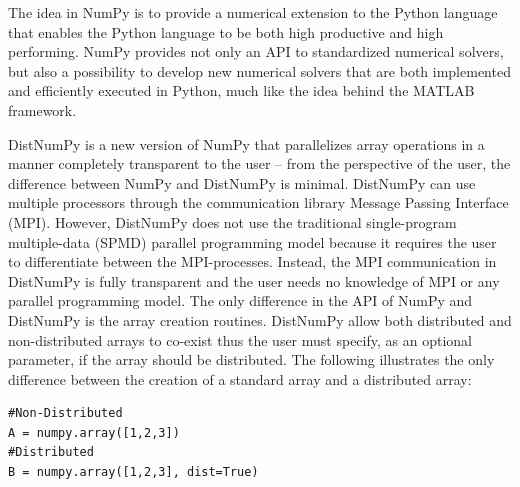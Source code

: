 \documentclass[preprint]{../PGAS10/sigplanconf}
\begin{document}
The idea in NumPy is to provide a numerical extension to the Python language that enables the Python language to be both high productive and high performing. NumPy provides not only an API to standardized numerical solvers, but also a possibility to develop new numerical solvers that are both implemented and efficiently executed in Python, much like the idea behind the MATLAB\cite{guide1998mathworks} framework. 

DistNumPy is a new version of NumPy that parallelizes array operations in a manner completely transparent to the user -- from the perspective of the user, the difference between NumPy and DistNumPy is minimal. DistNumPy can use multiple processors through the communication library Message Passing Interface (MPI)\cite{mpi}. However, DistNumPy does not use the traditional single-program multiple-data (SPMD) parallel programming model because it requires the user to differentiate between the MPI-processes. Instead, the MPI communication in DistNumPy is fully transparent and the user needs no knowledge of MPI or any parallel programming model. 
The only difference in the API of NumPy and DistNumPy is the array creation routines. DistNumPy allow both distributed and non-distributed arrays to co-exist thus the user must specify, as an optional parameter, if the array should be distributed. The following illustrates the only difference between the creation of a standard array and a distributed array:
\lstset{frame=none, xleftmargin=0mm, numbers=none}
\begin{lstlisting}
#Non-Distributed
A = numpy.array([1,2,3])
#Distributed
B = numpy.array([1,2,3], dist=True)
\end{lstlisting}
\lstset{frame=single, xleftmargin=5mm, numbers=left}
\end{document}
